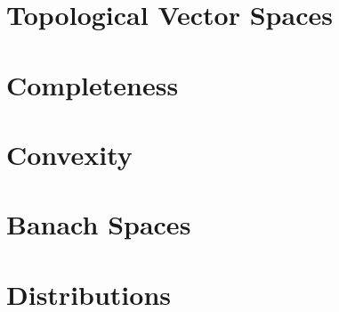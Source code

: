 \setcounter{chapter}{0}
\chapter{Topological Vector Spaces}

\chapter{Completeness}

\chapter{Convexity}

\chapter{Banach Spaces}

%
\setcounter{chapter}{5}
%
\chapter{Distributions}
